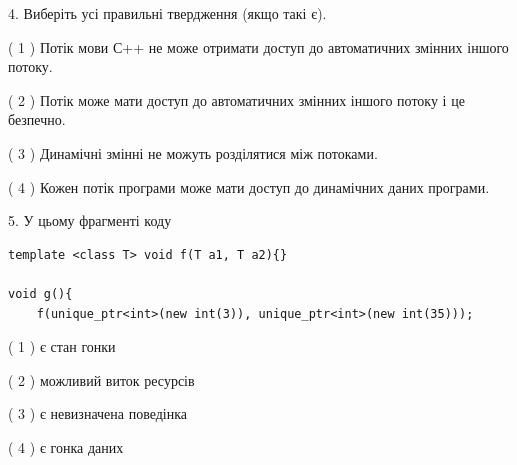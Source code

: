 \documentclass[12pt, ukrainian]{article}
\begin{document}
\begin {large}
{%
4. Виберіть усі правильні твердження (якщо такі є).\par
\vspace{2mm}

( 1 ) Потік мови С++ не може отримати доступ до автоматичних змінних іншого потоку.%

( 2 ) Потік може мати доступ до автоматичних змінних іншого потоку і це безпечно.%

( 3 ) Динамічні змінні не можуть розділятися між потоками.%

( 4 ) Кожен потік програми може мати доступ до динамічних даних програми.%


5. У цьому фрагменті коду
\begin{verbatim}
template <class T> void f(T a1, T a2){}

void g(){
    f(unique_ptr<int>(new int(3)), unique_ptr<int>(new int(35)));
\end{verbatim}

( 1 ) є стан гонки%

( 2 ) можливий виток ресурсів%

( 3 ) є невизначена поведінка%

( 4 ) є гонка даних%
}
\end {large}
\end{document}
